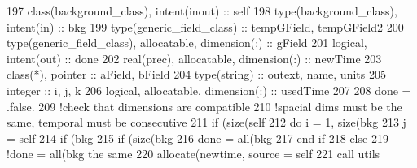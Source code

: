 \begin{DoxyCode}
197     \textcolor{keywordtype}{class}(background\_class), \textcolor{keywordtype}{intent(inout)} :: self
198     \textcolor{keywordtype}{type}(background\_class), \textcolor{keywordtype}{intent(in)} :: bkg
199     \textcolor{keywordtype}{type}(generic\_field\_class) :: tempGField, tempGField2
200     \textcolor{keywordtype}{type}(generic\_field\_class), \textcolor{keywordtype}{allocatable}, \textcolor{keywordtype}{dimension(:)} :: gField
201     \textcolor{keywordtype}{logical}, \textcolor{keywordtype}{intent(out)} :: done
202     \textcolor{keywordtype}{real(prec)}, \textcolor{keywordtype}{allocatable}, \textcolor{keywordtype}{dimension(:)} :: newTime
203     \textcolor{keywordtype}{class}(*), \textcolor{keywordtype}{pointer} :: aField, bField
204     \textcolor{keywordtype}{type}(string) :: outext, name, units
205     \textcolor{keywordtype}{integer} :: i, j, k
206     \textcolor{keywordtype}{logical}, \textcolor{keywordtype}{allocatable}, \textcolor{keywordtype}{dimension(:)} :: usedTime
207 
208     done = .false.
209     \textcolor{comment}{!check that dimensions are compatible}
210     \textcolor{comment}{!spacial dims must be the same, temporal must be consecutive}
211     \textcolor{keywordflow}{if} (\textcolor{keyword}{size}(self%
212         \textcolor{keywordflow}{do} i = 1, \textcolor{keyword}{size}(bkg%
213             j = self%
214             \textcolor{keywordflow}{if} (bkg%
215                 \textcolor{keywordflow}{if} (\textcolor{keyword}{size}(bkg%
216                     done = all(bkg%
217 \textcolor{keywordflow}{                end if}
218             \textcolor{keywordflow}{else}
219                 \textcolor{comment}{!done = all(bkg%
       the same}
220                 \textcolor{keyword}{allocate}(newtime, source = self%
221                 \textcolor{keyword}{call }utils%

\end{DoxyCode}
